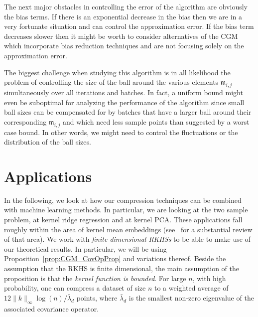 \documentclass[10pt]{amsart}
\theoremstyle{definition}\newtheorem{defi}[theo]{Definition}\newtheorem{rema}[theo]{Remark}\newtheorem{exam}[theo]{Example}\newtheorem{exem}[theo]{Example}\newtheorem{nota}[theo]{Notation}
\theoremstyle{remark}
\newcommand{\mean}{\mathfrak{m}}
\begin{document}
The next major obstacles in controlling the error of the algorithm are obviously the bias terms. If there is an exponential decrease in the bias then we are in a very fortunate situation and can control the approximation error. If the bias term decreases slower then it might be worth to consider alternatives of the CGM which incorporate bias reduction techniques and are not focusing solely on the approximation error.

The biggest challenge when studying this algorithm is in all likelihood the problem of controlling the size of the ball around the various elements $\mean_{i,j}$ simultaneously over all iterations and batches. In fact, a uniform bound might even be suboptimal for analyzing the performance of the algorithm since small ball sizes can be compensated for by batches that have a larger ball around their corresponding $\mean_{i,j}$ and which need less sample points than suggested by a worst case bound. In other words, we might need to control the fluctuations or the distribution of the ball sizes.



\section{Applications} \label{sec:applications}

In the following, we look at how our compression techniques can be combined with machine learning methods. In particular, we are looking at the two sample problem, at kernel ridge regression and at kernel PCA. These applications fall roughly within the area of kernel mean embeddings (see~\cite{MUA17} for a substantial review of that area). We work with \emph{finite dimensional RKHSs} to be able to make use of our theoretical results. In particular, we will be using Proposition~\ref{prop:CGM_CovOpProp} and variations thereof. Beside the assumption that the RKHS is finite dimensional, the main assumption of the proposition is that the \emph{kernel function is bounded}. For large $n$, with high probability, one can compress a dataset of size $n$ to a weighted average of $12 \|k\|_\infty \log(n)/\bar \lambda_d$ points, where $\bar \lambda_d$ is the smallest non-zero eigenvalue of the associated covariance operator.
\end{document}
